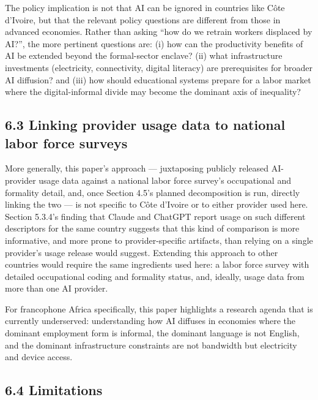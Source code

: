 \documentclass[
  11pt,
]{article}
\begin{document}
The policy implication is not that AI can be ignored in countries like
Côte d'Ivoire, but that the relevant policy questions are different from
those in advanced economies. Rather than asking ``how do we retrain
workers displaced by AI?'', the more pertinent questions are: (i) how
can the productivity benefits of AI be extended beyond the formal-sector
enclave? (ii) what infrastructure investments (electricity,
connectivity, digital literacy) are prerequisites for broader AI
diffusion? and (iii) how should educational systems prepare for a labor
market where the digital-informal divide may become the dominant axis of
inequality?

\subsection{6.3 Linking provider usage data to national labor force
surveys}\label{linking-provider-usage-data-to-national-labor-force-surveys}

More generally, this paper's approach --- juxtaposing publicly released
AI-provider usage data against a national labor force survey's
occupational and formality detail, and, once Section 4.5's planned
decomposition is run, directly linking the two --- is not specific to
Côte d'Ivoire or to either provider used here. Section 5.3.4's finding
that Claude and ChatGPT report usage on such different descriptors for
the same country suggests that this kind of comparison is more
informative, and more prone to provider-specific artifacts, than relying
on a single provider's usage release would suggest. Extending this
approach to other countries would require the same ingredients used
here: a labor force survey with detailed occupational coding and
formality status, and, ideally, usage data from more than one AI
provider.

For francophone Africa specifically, this paper highlights a research
agenda that is currently underserved: understanding how AI diffuses in
economies where the dominant employment form is informal, the dominant
language is not English, and the dominant infrastructure constraints are
not bandwidth but electricity and device access.

\subsection{6.4 Limitations}\label{limitations}
\end{document}
